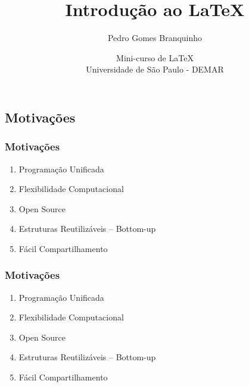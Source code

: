 \documentclass{beamer}
\title[Introdução ao \LaTeX]{\Huge{Introdução ao \LaTeX}}
\author[Branquinho]{Pedro Gomes Branquinho \\
  \text{\scriptsize{pedro.branquinho@usp.br}}}
\date[EEL-USP]{\scriptsize{Mini-curso de \LaTeX} \\ Universidade de São Paulo - DEMAR}
\begin{document}
{



  \begin{frame}
    \titlepage
  \end{frame}
}


\begin{frame}
  \section{Motivações}
  \frametitle{Motivações}

  \begin{enumerate}
  \item{Programação Unificada}
  \item{Flexibilidade Computacional}
  \item{Open Source}
  \item{Estruturas Reutilizáveis -- Bottom-up}
  \item{Fácil Compartilhamento}
  \end{enumerate}

\end{frame}

\begin{frame}
  \frametitle{Motivações}

  \begin{enumerate}
  \item<1->{Programação Unificada}
  \item<5->{Flexibilidade Computacional}
  \item<2->{Open Source}
  \item<3->{Estruturas Reutilizáveis -- Bottom-up}
  \item<4->{Fácil Compartilhamento}
  \end{enumerate}

\end{frame}
\end{document}
